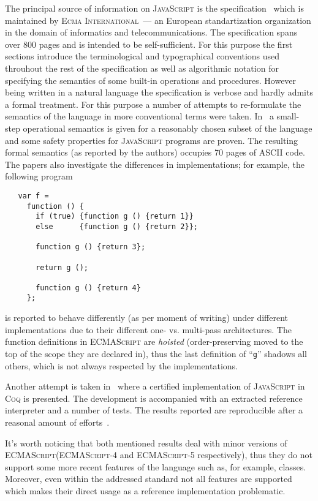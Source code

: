 \documentclass{article}
\newcommand{\js}{\textsc{JavaScript}\xspace}
\newcommand{\es}{\textsc{ECMAScript}\xspace}
\newcommand{\ecma}{\textsc{Ecma International}\xspace}
\begin{document}
The principal source of information on \js is the specification~\cite{Spec} which is maintained by
\ecma~--- an European standartization organization in the domain of informatics and telecommunications.
The specification spans over 800 pages and is intended to be self-sufficient. For this purpose
the first sections introduce the terminological and typographical conventions used throuhout the rest of
the specification as well as algorithmic notation for specifying the semantics of some built-in operations
and procedures. However being written in a natural language the specification is verbose and hardly admits
a formal treatment. For this purpose a number of attempts to re-formulate the semantics of the language
in more conventional terms were taken. In~\cite{Operational1,Operational2} a small-step operational
semantics is given for a reasonably chosen subset of the language and some safety properties for
\js programs are proven. The resulting formal semantics (as reported by the authors) occupies 70 pages of
ASCII code. The papers also investigate the differences in implementations; for example, the following
program

\begin{lstlisting}
   var f =
     function () {
       if (true) {function g () {return 1}}
       else      {function g () {return 2}};
       
       function g () {return 3};
    
       return g ();
    
       function g () {return 4}
     };
\end{lstlisting}

is reported to behave differently (as per moment of writing) under different implementations due to their
different one- vs. multi-pass architectures. The function definitions in \es are \emph{hoisted} (order-preserving
moved to the top of the scope they are declared in), thus the last definition of ``\lstinline|g|'' shadows
all others, which is not always respected by the implementations.

Another attempt is taken in~\cite{Trusted,JSCert} where a certified implementation of \js in \textsc{Coq} is
presented. The development is accompanied with an extracted reference interpreter and a number of tests. The
results reported are reproducible after a reasonal amount of efforts~\cite{JSCert-lozov}.

It's worth noticing that both mentioned results deal with minor versions of \es (\es-4 and \es-5 respectively), thus
they do not support some more recent features of the language such as, for example, classes. Moreover, even
within the addressed standard not all features are supported which makes their direct usage as a reference
implementation problematic.
\end{document}
